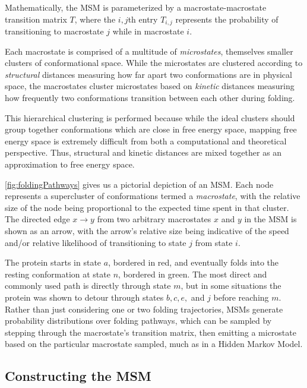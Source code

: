 \documentclass{article}
\begin{document}
Mathematically, the MSM is parameterized by a macrostate-macrostate transition matrix $T$, where the $i,j$th entry $T_{i,j}$ represents the probability of transitioning to macrostate $j$ while in macrostate $i$. 

Each macrostate is comprised of a multitude of \textit{microstates}, themselves smaller clusters of conformational space. While the microstates are clustered according to \textit{structural} distances measuring how far apart two conformations are in physical space, the macrostates cluster microstates based on \textit{kinetic} distances measuring how frequently two conformations transition between each other during folding. 

This hierarchical clustering is performed because while the ideal clusters should group together conformations which are close in free energy space, mapping free energy space is extremely difficult from both a computational and theoretical perspective. Thus, structural and kinetic distances are mixed together as an approximation to free energy space. 

\autoref{fig:foldingPathways} gives us a pictorial depiction of an MSM. Each node represents a supercluster of conformations termed a \textit{macrostate}, with the relative size of the node being proportional to the expected time spent in that cluster. The directed edge $x \to y$ from two arbitrary macrostates $x$ and $y$ in the MSM is shown as an arrow, with the arrow's relative size being indicative of the speed and/or relative likelihood of transitioning to state $j$ from state $i$.

The protein starts in state $a$, bordered in red, and eventually folds into the resting conformation at state $n$, bordered in green. The most direct and commonly used path is directly through state $m$, but in some situations the protein was shown to detour through states $b, c, e,$ and $j$ before reaching $m$. Rather than just considering one or two folding trajectories, MSMs generate probability distributions over folding pathways, which can be sampled by stepping through the macrostate's transition matrix, then emitting a microstate based on the particular macrostate sampled, much as in a Hidden Markov Model. 

\subsection{Constructing the MSM}
\end{document}
